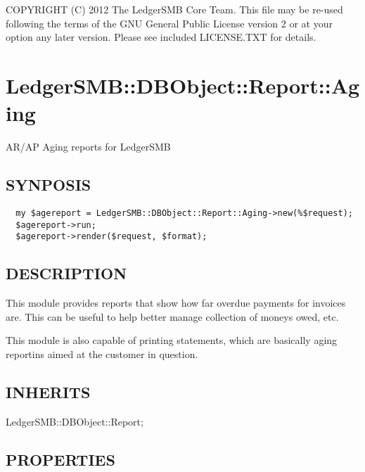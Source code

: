 \begin{description}
\begin{description}
\begin{description}
\begin{description}
\begin{description}
\begin{description}
\begin{description}
\begin{description}
\begin{description}
\begin{description}
COPYRIGHT (C) 2012 The LedgerSMB Core Team.  This file may be re-used following
the terms of the GNU General Public License version 2 or at your option any
later version.  Please see included LICENSE.TXT for details.

\section{LedgerSMB::DBObject::Report::Aging\label{LedgerSMB::DBObject::Report::Aging}}


AR/AP Aging reports for LedgerSMB

\subsection*{SYNPOSIS\label{LedgerSMB::DBObject::Report::Aging_SYNPOSIS}}
\begin{verbatim}
  my $agereport = LedgerSMB::DBObject::Report::Aging->new(%$request);
  $agereport->run;
  $agereport->render($request, $format);
\end{verbatim}
\subsection*{DESCRIPTION\label{LedgerSMB::DBObject::Report::Aging_DESCRIPTION}}


This module provides reports that show how far overdue payments for invoices
are.  This can be useful to help better manage collection of moneys owed, etc.



This module is also capable of printing statements, which are basically aging
reportins aimed at the customer in question.

\subsection*{INHERITS\label{LedgerSMB::DBObject::Report::Aging_INHERITS}}
\begin{description}

\item[{LedgerSMB::DBObject::Report;}] \mbox{}\end{description}
\subsection*{PROPERTIES\label{LedgerSMB::DBObject::Report::Aging_PROPERTIES}}
\begin{description}


\end{description}
\end{description}
\end{description}
\end{description}
\end{description}
\end{description}
\end{description}
\end{description}
\end{description}
\end{description}
\end{description}
